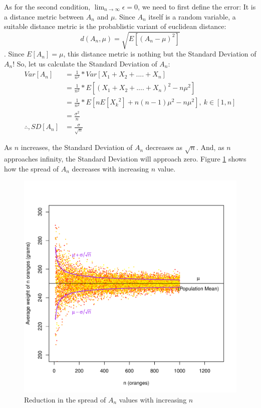 As for the second condition, $ \lim_{n\to\infty} \epsilon = 0 $, we need to first define the error: It is a distance metric between $A_n$ and $\mu$. Since $A_n$ itself is a random variable, a suitable distance metric is the probablistic variant of euclidean distance: \[d(A_n, \mu) = \sqrt{E[(A_n-\mu)^2]}\]. Since $E[A_n] = \mu$, this distance metric is nothing but the Standard Deviation of $A_n$! So, let us calculate the Standard Deviation of $A_n$:
	\begin{align*}
		Var[A_n] 	&= \frac{1}{n^2} * Var[X_1+X_2+....+X_n] \\
				&= \frac{1}{n^2} * E[(X_1+X_2+....+X_n)^2 - n\mu^2] \\
				&= \frac{1}{n^2} * E[nE[{X_k}^2] + n(n-1)\mu^2 - n\mu^2], \ k \in [1,n] \\
				&= \frac{\sigma^2}{n} \\
		\therefore,
		SD[A_n] 	&= \frac{\sigma}{\sqrt{n}}		
	\end{align*}

As $n$ increases, the Standard Deviation of $A_n$ decreases as $\sqrt{n}$. And, as $n$ approaches infinity, the Standard Deviation will approach zero. Figure \ref{fig:var_vs_n} shows how the spread of $A_n$ decreases with increasing $n$ value.
\begin{figure}
  \centering
    \includegraphics[width=\textwidth]{Statistics/var_vs_n}
  \caption{Reduction in the spread of $A_n$ values with increasing $n$}
  \label{fig:var_vs_n}
\end{figure}

